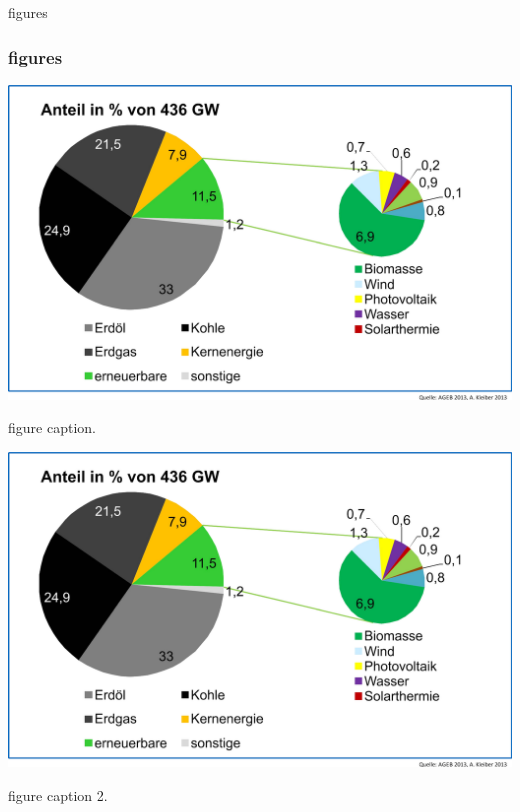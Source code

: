 \documentclass[final]{beamer} %
\begin{document}
\begin{frame}
\begin{minipage}[t]{.49\textwidth}
    \begin{kasten}{\large figures}
      \begin{center}
      \frametitle{figures}
      \begin{minipage}[]{0.45\textwidth}
        \includegraphics[width=\textwidth]{primaerenergieverbrauch_dt_2013}\par
        figure caption.
      \end{minipage}\hfill
      \begin{minipage}[]{0.45\textwidth}
			  \centerline{
        \includegraphics[width=.8\textwidth]{primaerenergieverbrauch_dt_2013}}\par
        figure caption 2.
      \end{minipage}
      \end{center}
    \end{kasten}
  \vfill
  \end{minipage}\hfill

\end{frame}
\end{document}
